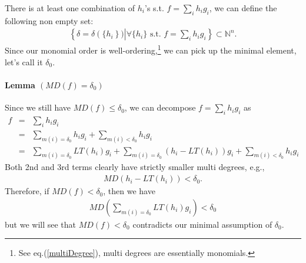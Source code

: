 \documentclass[11pt]{book}
\begin{document}
There is at least one combination of $h_i$'s s.t. $f = \sum_i h_i g_i$, we can define the following non empty set:
\begin{eqnarray}
\left\{ \delta = \delta\left(\{h_i \right\}) \left| \forall \{h_i\} \text{ s.t. } f = \sum_i h_i g_i \right. \right\} \subset \mathbb{N}^n.
\end{eqnarray}
Since our monomial order is well-ordering,\footnote{See eq.(\ref{multiDegree}), multi degrees are essentially monomials.} we can pick up the minimal element, let's call it $\delta_0$.

\paragraph{Lemma $(MD(f) = \delta_0)$}
Since we still have $MD(f) \leq \delta_0$, we can decompose $f = \sum_i h_i g_i$ as
\begin{eqnarray}
\nonumber
f &=& \sum_i h_i g_i \\
\nonumber
&=& \sum_{m(i) = \delta_0} h_i g_i + \sum_{m(i) < \delta_0} h_i g_i \\
&=& \sum_{m(i) = \delta_0} LT(h_i) g_i + \sum_{m(i) = \delta_0} \left(h_i - LT(h_i) \right) g_i + \sum_{m(i) < \delta_0} h_i g_i \qquad
\end{eqnarray}
Both 2nd and 3rd terms clearly have strictly smaller multi degrees, e.g.,
\begin{eqnarray}
MD\left( h_i - LT(h_i) \right) < \delta_0.
\end{eqnarray}
Therefore, if $MD(f) < \delta_0$, then we have
\begin{eqnarray}
\label{keyUpperBound}
MD\left( \sum_{m(i) = \delta_0} LT(h_i) g_i \right) < \delta_0
\end{eqnarray}
but we will see that $MD(f) < \delta_0$ contradicts our minimal assumption of $\delta_0$.
\end{document}

